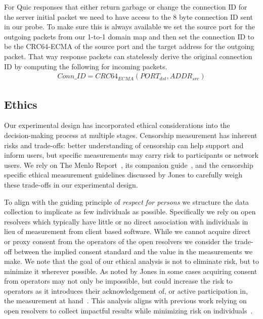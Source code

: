 For Quic responses that either return garbage or change the connection ID for
the server initial packet we need to have access to the 8 byte connection ID
sent in our probe. To make sure this is always available we set the source port
for the outgoing packets from our 1-to-1 domain map and then set the connection
ID to be the CRC64-ECMA of the source port and the target address for the
outgoing packet. That way response packets can statelessly derive the original
connection ID by computing the following for incoming packets.
\begin{gather*}
Conn\_ID = CRC64_{ECMA}(PORT_{dst},ADDR_{src})
\end{gather*}


\subsection{Ethics}\label{sec:methodology:ethics}
Our experimental design has incorporated ethical considerations into the
decision-making process at multiple stages.
Censorship measurement has inherent risks and trade-offs: better understanding
of censorship can help support and inform users, but specific measurements may
carry risk to participants or network users.
We rely on The Menlo Report~\cite{menlo}, its companion
guide~\cite{menlo-companion}, and the censorship specific ethical measurement
guidelines discussed by Jones \etal \cite{jones2015ethical} to
carefully weigh these trade-offs in our experimental design.

To align with the guiding principle of \textit{respect for persons} we
structure the data collection to implicate as few individuals as possible.
Specifically we rely on open resolvers which typically have little or no direct
association with individuals in lieu of measurement from client based
software. While we cannot acquire direct or proxy consent from the operators of
the open resolvers we consider the trade-off between the implied consent
standard and the value in the measurements we make. 
We note that the goal of our ethical analysis is not to eliminate risk, but to
minimize it wherever possible. As noted by Jones \etal in some cases acquiring
consent from operators may not only be impossible, but could increase the risk to
operators as it introduces their acknowledgement of, or active participation
in, the measurement at hand~\cite{jones2015ethical}. This analysis aligns with
previous work relying on open resolvers to collect impactful results while
minimizing risk on
individuals~\cite{pearce2017global,scott2016satellite,sundara2020censored}.

